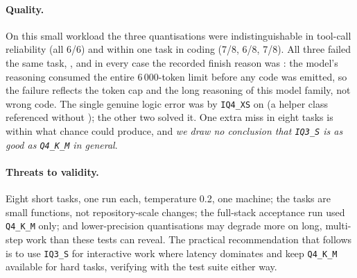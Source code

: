 \paragraph{Quality.} On this small workload the three quantisations were indistinguishable in tool-call reliability (all 6/6) and within one task in coding (7/8, 6/8, 7/8). All three failed the same task, , and in every case the recorded finish reason was : the model's reasoning consumed the entire 6\,000-token limit before any code was emitted, so the failure reflects the token cap and the long reasoning of this model family, not wrong code. The single genuine logic error was by \texttt{IQ4\_XS} on  (a helper class referenced without ); the other two solved it. One extra miss in eight tasks is within what chance could produce, and \emph{we draw no conclusion that \texttt{IQ3\_S} is as good as \texttt{Q4\_K\_M} in general}.

\paragraph{Threats to validity.} Eight short tasks, one run each, temperature 0.2, one machine; the tasks are small functions, not repository-scale changes; the full-stack acceptance run used \texttt{Q4\_K\_M} only; and lower-precision quantisations may degrade more on long, multi-step work than these tests can reveal. The practical recommendation that follows is to use \texttt{IQ3\_S} for interactive work where latency dominates and keep \texttt{Q4\_K\_M} available for hard tasks, verifying with the test suite either way.
